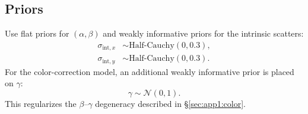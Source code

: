 \subsection{Priors}
Use flat priors for $(\alpha,\beta)$ and weakly informative priors for the intrinsic scatters:
\begin{align}
\sigma_{\text{int},x} &\sim \text{Half-Cauchy}\!\left(0, 0.3\right),\\
\sigma_{\text{int},y} &\sim \text{Half-Cauchy}\!\left(0, 0.3\right).
\end{align}
For the color-correction model, an additional weakly informative prior is placed on $\gamma$:
\begin{equation}
\gamma \sim \mathcal{N}(0, 1).
\end{equation}
This regularizes the $\beta$--$\gamma$ degeneracy described in \S\ref{sec:app1:color}.